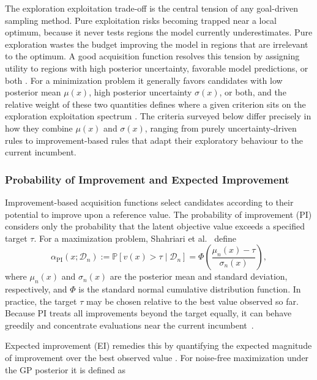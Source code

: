 \documentclass[12pt,a4paper]{report}
\begin{document}
        The exploration exploitation trade-off is the central tension of any goal-driven sampling method. Pure exploitation risks becoming trapped near a local optimum, because it never tests regions the model currently underestimates. Pure exploration wastes the budget improving the model in regions that are irrelevant to the optimum. A good acquisition function resolves this tension by assigning utility to regions with high posterior uncertainty, favorable model predictions, or both \cite{shahriari2016taking}. For a minimization problem it generally favors candidates with low posterior mean $\mu(x)$, high posterior uncertainty $\sigma(x)$, or both, and the relative weight of these two quantities defines where a given criterion sits on the exploration exploitation spectrum \cite{di2024active,snoek2012practical}. The criteria surveyed below differ precisely in how they combine $\mu(x)$ and $\sigma(x)$, ranging from purely uncertainty-driven rules to improvement-based rules that adapt their exploratory behaviour to the current incumbent.

        \subsubsection{Probability of Improvement and Expected Improvement}
        Improvement-based acquisition functions select candidates according to their potential to improve upon a reference value. The probability of improvement (PI) considers only the probability that the latent objective value exceeds a specified target $\tau$. For a maximization problem, Shahriari et al.~\cite{shahriari2015taking} define
        \[
        \alpha_{\mathrm{PI}}(x;\mathcal{D}_n)
        :=
        \mathbb{P}\!\left[v(x)>\tau\mid\mathcal{D}_n\right]
        =
        \Phi\!\left(
        \frac{\mu_n(x)-\tau}{\sigma_n(x)}
        \right),
        \]
        where $\mu_n(x)$ and $\sigma_n(x)$ are the posterior mean and standard deviation, respectively, and $\Phi$ is the standard normal cumulative distribution function. In practice, the target $\tau$ may be chosen relative to the best value observed so far. Because PI treats all improvements beyond the target equally, it can behave greedily and concentrate evaluations near the current incumbent~\cite{shahriari2015taking}.

        Expected improvement (EI) remedies this by quantifying the expected magnitude of improvement over the best observed value \cite{jones1998efficient}. For noise-free maximization under the GP posterior it is defined as
\end{document}
